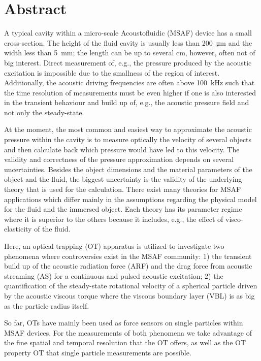 \chapter*{Abstract} 

A typical cavity within a micro-scale Acoustofluidic (MSAF) device has a small 
cross-section. The height of the fluid cavity is usually less than 
\SI{200}{\um} and the width less than \SI{5}{\mm}; the length can be up to 
several \si{\cm}, however, often not of big interest. Direct measurement of, 
e.g., the pressure produced by the acoustic excitation is impossible due to the 
smallness of the region of interest. Additionally, the acoustic driving 
frequencies are often above \SI{100}{\kilo\hertz} such that the time resolution 
of measurements must be even higher if one is also interested in the transient 
behaviour and build up of, e.g., the acoustic pressure field and not only the 
steady-state.

At the moment, the most common and easiest way to approximate the acoustic 
pressure within the cavity is to measure optically the velocity of several 
objects and then calculate back which pressure would have led to this velocity. 
The validity and correctness of the pressure approximation depends on several 
uncertainties. Besides the object dimensions and the material parameters of the 
object and the fluid, the biggest uncertainty is the validity of the underlying 
theory that is used for the calculation. There exist many theories for MSAF 
applications which differ mainly in the assumptions regarding the physical 
model for the fluid and the immersed object.  Each theory has its parameter 
regime where it is superior to the others because it includes, e.g., the effect 
of visco-elasticity of the fluid.

Here, an optical trapping (OT) apparatus is utilized to investigate two 
phenomena where controversies exist in the MSAF community: 1) the transient 
build up of the acoustic radiation force (ARF) and the drag force from acoustic 
streaming (AS) for a continuous and pulsed acoustic excitation; 2) the 
quantification of the steady-state rotational velocity of a spherical particle 
driven by the acoustic viscous torque where the viscous boundary layer (VBL) is 
as big as the particle radius itself.

So far, OTs have mainly been used as force sensors on single particles within 
MSAF devices. For the measurements of both phenomena we take advantage of the 
fine spatial and temporal resolution that the OT offers, as well as the OT 
property OT that single particle measurements are possible.

